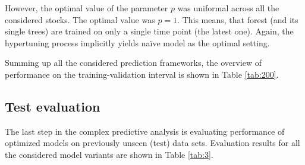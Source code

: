 \documentclass{svk_en}
\begin{document}
However, the optimal value of the parameter $p$ was uniformal across all the considered stocks. The optimal value was $p = 1$. This means, that forest (and its single trees) are trained on
only a single time point (the latest one). Again, the hypertuning process implicitly yields naïve model as the optimal setting.
\newline
\par
Summing up all the considered prediction frameworks, the overview of performance on the training-validation interval is shown in Table \ref{tab:200}.
\begin{table}[H]
\centering
{}
\caption{\centering Evaluation of tuned models on training-validation interval.}
\label{tab:200}
\end{table}

\subsection{Test evaluation}
The last step in the complex predictive analysis is evaluating performance of optimized models on previously unseen (test) data sets.
Evaluation results for all the considered model variants are shown in Table \ref{tab:3}.
\begin{table}[H]
\centering
{}
\caption{Evaluation of tuned models on test interval.}
\label{tab:3}
\end{table}
\end{document}
